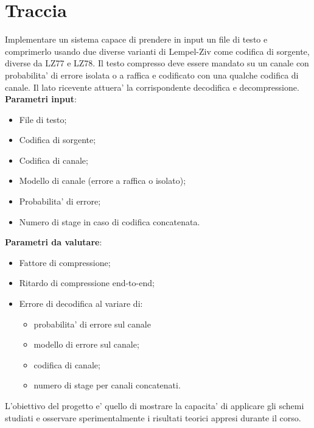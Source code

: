 \documentclass[a4paper,11pt]{article}
\theoremstyle{definition}
\begin{document}
\begin{frontespizio}
\end{frontespizio}


\tableofcontents

\cleardoublepage

\section{Traccia}
Implementare un sistema capace di prendere in input un file di testo e comprimerlo usando due diverse varianti di Lempel-Ziv come codifica di sorgente, diverse da LZ77 e LZ78. Il testo compresso deve essere mandato su un canale con probabilita' di errore isolata o a raffica e codificato con una qualche codifica di canale. Il lato ricevente attuera' la corrispondente decodifica e decompressione.
\newline
\noindent \textbf{Parametri input}:
\begin{itemize}
	\item File di testo;
	\item Codifica di sorgente;
	\item Codifica di canale;
	\item Modello di canale (errore a raffica o isolato);
	\item Probabilita' di errore;
	\item Numero di stage in caso di codifica concatenata.
\end{itemize}

\noindent \textbf{Parametri da valutare}:
\begin{itemize}
	\item Fattore di compressione;
	\item Ritardo di compressione end-to-end;
	\item Errore di decodifica al variare di:
	\begin{itemize}
		\item probabilita' di errore sul canale
		\item modello di errore sul canale;
		\item codifica di canale;
		\item numero di stage per canali concatenati. 
	\end{itemize}
\end{itemize}

\noindent L'obiettivo del progetto e' quello di mostrare la capacita' di applicare gli schemi studiati e osservare sperimentalmente i risultati teorici appresi durante il corso. 
\end{document}
